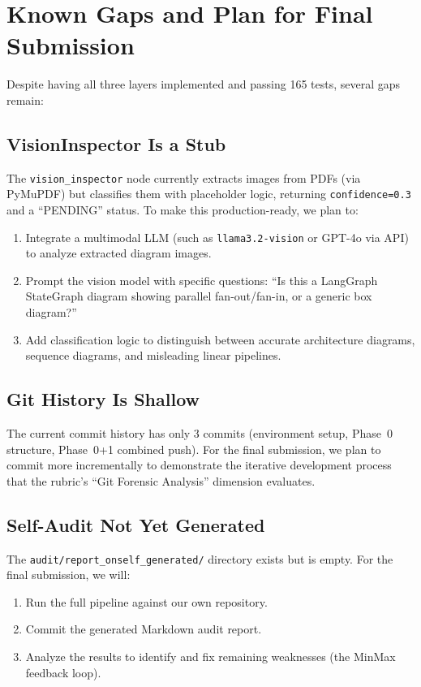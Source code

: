 \documentclass[12pt,a4paper]{article}
\begin{document}
\section{Known Gaps and Plan for Final Submission}

Despite having all three layers implemented and passing 165 tests, several gaps remain:

\subsection{VisionInspector Is a Stub}

The \texttt{vision\_inspector} node currently extracts images from PDFs (via PyMuPDF) but classifies them with placeholder logic, returning \texttt{confidence=0.3} and a ``PENDING'' status. To make this production-ready, we plan to:
\begin{enumerate}[nosep]
  \item Integrate a multimodal LLM (such as \texttt{llama3.2-vision} or GPT-4o via API) to analyze extracted diagram images.
  \item Prompt the vision model with specific questions: ``Is this a LangGraph StateGraph diagram showing parallel fan-out/fan-in, or a generic box diagram?''
  \item Add classification logic to distinguish between accurate architecture diagrams, sequence diagrams, and misleading linear pipelines.
\end{enumerate}

\subsection{Git History Is Shallow}

The current commit history has only 3 commits (environment setup, Phase~0 structure, Phase~0+1 combined push). For the final submission, we plan to commit more incrementally to demonstrate the iterative development process that the rubric's ``Git Forensic Analysis'' dimension evaluates.

\subsection{Self-Audit Not Yet Generated}

The \texttt{audit/report\_onself\_generated/} directory exists but is empty. For the final submission, we will:
\begin{enumerate}[nosep]
  \item Run the full pipeline against our own repository.
  \item Commit the generated Markdown audit report.
  \item Analyze the results to identify and fix remaining weaknesses (the MinMax feedback loop).
\end{enumerate}
\end{document}

